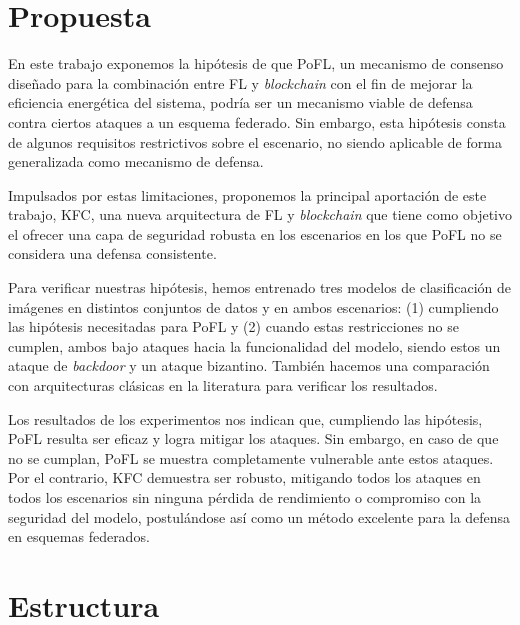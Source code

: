 \section{Propuesta}

En este trabajo exponemos la hipótesis de que \ac{PoFL}, un mecanismo de consenso diseñado para la combinación entre \ac{FL} y \textit{blockchain} con el fin de mejorar la eficiencia energética del sistema, podría ser un mecanismo viable de defensa contra ciertos ataques a un esquema federado. Sin embargo, esta hipótesis consta de algunos requisitos restrictivos sobre el escenario, no siendo aplicable de forma generalizada como mecanismo de defensa.

Impulsados por estas limitaciones, proponemos la principal aportación de este trabajo, \ac{KFC}, una nueva arquitectura de \ac{FL} y \textit{blockchain} que tiene como objetivo el ofrecer una capa de seguridad robusta en los escenarios en los que \ac{PoFL} no se considera una defensa consistente.

Para verificar nuestras hipótesis, hemos entrenado tres modelos de clasificación de imágenes en distintos conjuntos de datos y en ambos escenarios: (1) cumpliendo las hipótesis necesitadas para \ac{PoFL} y (2) cuando estas restricciones no se cumplen, ambos bajo ataques hacia la funcionalidad del modelo, siendo estos un ataque de \textit{backdoor} y un ataque bizantino. También hacemos una comparación con arquitecturas clásicas en la literatura para verificar los resultados.

Los resultados de los experimentos nos indican que, cumpliendo las hipótesis, \ac{PoFL} resulta ser eficaz y logra mitigar los ataques. Sin embargo, en caso de que no se cumplan, \ac{PoFL} se muestra completamente vulnerable ante estos ataques. Por el contrario, \ac{KFC} demuestra ser robusto, mitigando todos los ataques en todos los escenarios sin ninguna pérdida de rendimiento o compromiso con la seguridad del modelo, postulándose así como un método excelente para la defensa en esquemas federados.

\section{Estructura}

